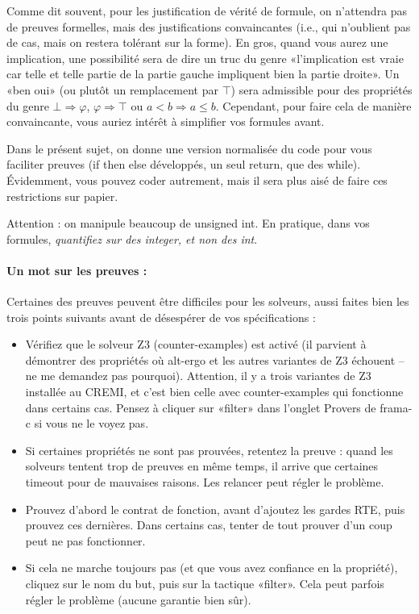 \documentclass[11pt,answers]{exam}
\begin{document}
Comme dit souvent, pour les justification de vérité de formule, on n’attendra pas de preuves formelles, mais des justifications convaincantes (i.e., qui n’oublient pas de cas, mais on restera tolérant sur la forme).
En gros, quand vous aurez une implication, une possibilité sera de dire un truc du genre «l’implication est vraie car telle et telle partie de la partie gauche impliquent bien la partie droite».
Un «ben oui» (ou plutôt un remplacement par $\top$) sera admissible pour des propriétés du genre $\bot \Rightarrow \varphi$, $\varphi \Rightarrow \top$ ou $a < b \Rightarrow a \leq b$.
Cependant, pour faire cela de manière convaincante, vous auriez intérêt à simplifier vos formules avant.

Dans le présent sujet, on donne une version normalisée du code pour vous faciliter
preuves (if then else développés, un seul return, que des while). Évidemment, vous pouvez
coder autrement, mais il sera plus aisé de faire ces restrictions sur papier.

Attention : on manipule beaucoup de unsigned int. En pratique, dans vos formules, \emph{quantifiez sur des integer, et non des int}.

\paragraph{Un mot sur les preuves :}

Certaines des preuves peuvent être difficiles pour les solveurs, aussi faites bien les trois points suivants avant de désespérer de vos spécifications :
\begin{itemize}
    \item Vérifiez que le solveur Z3 (counter-examples) est activé (il parvient à démontrer des propriétés où alt-ergo et les autres variantes de Z3 échouent -- ne me demandez pas pourquoi). Attention, il y a trois variantes de Z3 installée au CREMI, et c’est bien celle avec counter-examples qui fonctionne dans certains cas. Pensez à cliquer sur «filter» dans l’onglet Provers de frama-c si vous ne le voyez pas.
    \item Si certaines propriétés ne sont pas prouvées, retentez la preuve : quand les solveurs tentent trop de preuves en même temps, il arrive que certaines timeout pour de mauvaises raisons. Les relancer peut régler le problème.
    \item Prouvez d’abord le contrat de fonction, avant d’ajoutez les gardes RTE, puis prouvez ces dernières. Dans certains cas, tenter de tout prouver d’un coup peut ne pas fonctionner.
    \item Si cela ne marche toujours pas (et que vous avez confiance en la propriété), cliquez sur le nom du but, puis sur la tactique «filter». Cela peut parfois régler le problème (aucune garantie bien sûr).
\end{itemize}
\end{document}
